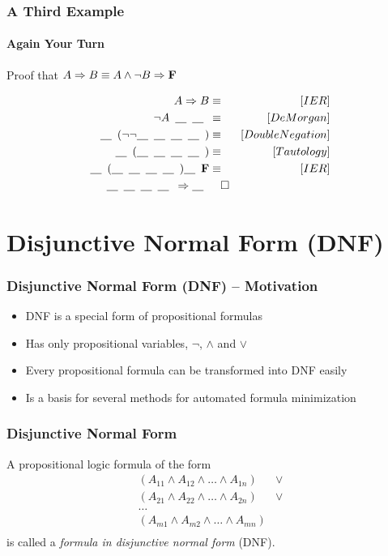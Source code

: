 \documentclass{beamer}
\theoremstyle{remark}
\begin{document}
\begin{frame}
	\frametitle{A Third Example}
	\framesubtitle{Again Your Turn}
	Proof that $A \Rightarrow B \equiv A \land \lnot B \Rightarrow \text{{\bf F}}$

	\newcommand{\ph}{\underline{\hspace{1em}}\hspace{.5em}}

	\begin{align}
		A \Rightarrow B & \equiv & [IER] \\
		\lnot A \hspace{.5em} \ph \ph & \equiv & [DeMorgan] \\
		\ph(\lnot\lnot\ph\ph\ph\ph) & \equiv & [Double Negation] \\
		\ph(\ph \ph \ph \ph) & \equiv & [Tautology]\\
		\ph(\ph \ph \ph \ph) \ph \text{{\bf F}} & \equiv & [IER] \\
		\ph \ph \ph \ph \Rightarrow \ph & \hspace{1em}\square
	\end{align}

\end{frame}

\section{Disjunctive Normal Form (DNF)}
\begin{frame}
	\frametitle{Disjunctive Normal Form (DNF) -- Motivation}
	\begin{itemize}
	\item DNF is a special form of propositional formulas
	\pause
	\item Has only propositional variables, $\lnot$, $\land$ and $\lor$
	\pause
	\item Every propositional formula can be transformed into DNF easily
	\pause
	\item Is a basis for several methods for automated formula minimization
\end{itemize}
\end{frame}

\begin{frame}
	\frametitle{Disjunctive Normal Form}
	\begin{definition}
	A propositional logic formula of the form
	\begin{align*}
		(A_{11} \land A_{12} \land \ldots \land A_{1n}) & \lor \\
		(A_{21} \land A_{22} \land \ldots \land A_{2n}) & \lor \\
		\ldots \\
		(A_{m1} \land A_{m2} \land \ldots \land A_{mn}) & \\
	\end{align*}
	is called a {\em formula in disjunctive normal form} (DNF).
\end{definition}

\end{frame}
\end{document}
